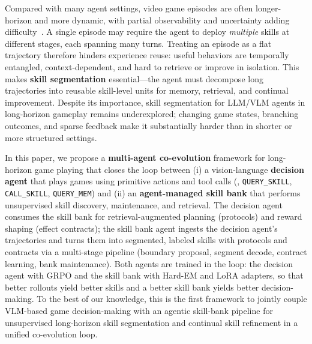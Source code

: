 Compared with many agent settings, video game episodes are often longer-horizon and more dynamic, with partial observability and uncertainty adding difficulty~\cite{berner2019dota, raad2024scaling}. A single episode may require the agent to deploy \emph{multiple} skills at different stages, each spanning many turns. Treating an episode as a flat trajectory therefore hinders experience reuse: useful behaviors are temporally entangled, context-dependent, and hard to retrieve or improve in isolation. This makes \textbf{skill segmentation} essential---the agent must decompose long trajectories into reusable skill-level units for memory, retrieval, and continual improvement. Despite its importance, skill segmentation for LLM/VLM agents in long-horizon gameplay remains underexplored; changing game states, branching outcomes, and sparse feedback make it substantially harder than in shorter or more structured settings.

In this paper, we propose a \textbf{multi-agent co-evolution} framework for long-horizon game playing that closes the loop between (i) a vision-language \textbf{decision agent} that plays games using primitive actions and tool calls (\eg, \texttt{QUERY\_SKILL}, \texttt{CALL\_SKILL}, \texttt{QUERY\_MEM}) and (ii) an \textbf{agent-managed skill bank} that performs unsupervised skill discovery, maintenance, and retrieval. The decision agent consumes the skill bank for retrieval-augmented planning (protocols) and reward shaping (effect contracts); the skill bank agent ingests the decision agent's trajectories and turns them into segmented, labeled skills with protocols and contracts via a multi-stage pipeline (boundary proposal, segment decode, contract learning, bank maintenance). Both agents are trained in the loop: the decision agent with GRPO and the skill bank with Hard-EM and LoRA adapters, so that better rollouts yield better skills and a better skill bank yields better decision-making. To the best of our knowledge, this is the first framework to jointly couple VLM-based game decision-making with an agentic skill-bank pipeline for unsupervised long-horizon skill segmentation and continual skill refinement in a unified co-evolution loop.

